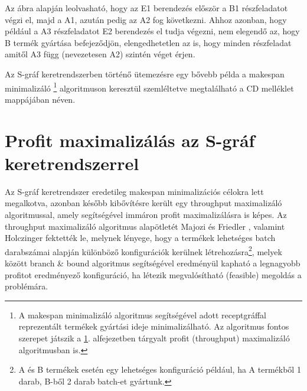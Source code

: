 Az ábra alapján leolvasható, hogy az E1 berendezés először a B1 részfeladatot végzi el, majd a A1, azután pedig az A2 fog következni.
Ahhoz azonban, hogy például a A3 részfeladatot E2 berendezés el tudja végezni, nem elegendő az, hogy B termék gyártása befejeződjön, elengedhetetlen az is, hogy minden részfeladat amitől A3 függ (nevezetesen A2) szintén véget érjen.

Az S-gráf keretrendszerben történő ütemezésre egy bővebb példa a makespan minimalizáló \footnote{A makespan minimalizáló algoritmus segítségével adott receptgráffal reprezentált termékek gyártási ideje minimalizálható. Az algoritmus fontos szerepet játszik a \ref{SgraphProfitMax}. alfejezetben tárgyalt profit (throughput) maximalizáló algoritmusban is.} algoritmuson keresztül szemléltetve megtalálható a CD melléklet  mappájában  néven. 
\section{Profit maximalizálás az S-gráf keretrendszerrel} \label{SgraphProfitMax}
Az S-gráf keretrendszer eredetileg makespan minimalizációs célokra lett megalkotva, azonban később kibővítésre került egy throughput maximalizáló algoritmussal, amely segítségével immáron profit maximalizálásra is képes.
Az throughput maximalizáló algoritmus alapötletét Majozi és Friedler \cite{doi:10.1021ie0604472}, valamint Holczinger \cite{HOLCZINGER2007649} fektették le, melynek lényege, hogy a termékek lehetséges batch darabszámai alapján különböző konfigurációk kerülnek létrehozásra\footnote{A és B termékek esetén egy lehetséges konfiguráció például, ha A termékből 1 darab, B-ből 2 darab batch-et gyártunk.}, melyek között branch \& bound algoritmus segítségével eredményül kapható a legnagyobb profitot eredményező konfiguráció, ha létezik megvalósítható (feasible) megoldás a problémára.

